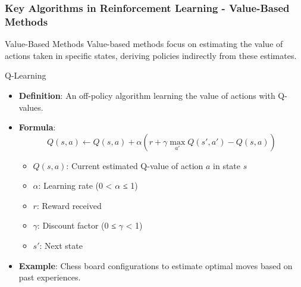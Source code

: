 \documentclass[aspectratio=169]{beamer}
\begin{document}
\begin{frame}[fragile]
  \frametitle{Key Algorithms in Reinforcement Learning - Value-Based Methods}
  \begin{block}{Value-Based Methods}
    Value-based methods focus on estimating the value of actions taken in specific states, deriving policies indirectly from these estimates.
  \end{block}

  \begin{block}{Q-Learning}
    \begin{itemize}
      \item \textbf{Definition}: An off-policy algorithm learning the value of actions with Q-values.
      \item \textbf{Formula}:
      \[
      Q(s, a) \leftarrow Q(s, a) + \alpha \left( r + \gamma \max_{a'} Q(s', a') - Q(s, a) \right)
      \]
      \begin{itemize}
        \item \( Q(s, a) \): Current estimated Q-value of action \( a \) in state \( s \)
        \item \( \alpha \): Learning rate (0 < \( \alpha \) ≤ 1)
        \item \( r \): Reward received
        \item \( \gamma \): Discount factor (0 ≤ \( \gamma \) < 1)
        \item \( s' \): Next state
      \end{itemize}
      \item \textbf{Example}: Chess board configurations to estimate optimal moves based on past experiences.
    \end{itemize}
  \end{block}
\end{frame}
\end{document}
